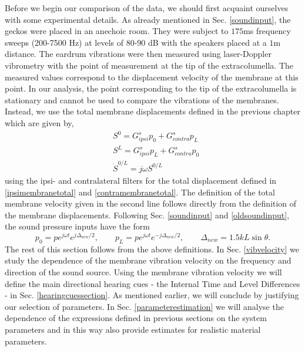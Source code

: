 Before we begin our comparison of the data, we should first acquaint ourselves with some experimental details. As already mentioned in Sec. \ref{soundinput}, the geckos were placed in
an anechoic room. They were subject to $175$ms frequency sweeps (200-7500 Hz) at levels of 80-90 dB with the speakers placed at
a $1$m distance. The eardrum vibrations were then measured using laser-Doppler vibrometry with the point
of measurement at the tip of the extracolumella. The measured values correspond to the displacement velocity of the membrane at this point.  
In our analysis, the point corresponding to the tip of the extracolumella is stationary and cannot be used to compare the vibrations of the membranes. 
Instead, we use the total membrane displacements defined in the previous chapter which are given by,
\begin{align}
 &S^0=G^s_{ipsi}p_0+G^s_{contra} p_L\\
 &S^L=G^s_{ipsi}p_L+G^s_{contra}p_0\\
 &\dot{S}^{0/L}=j\omega S^{0/L}\label{totalvelocity}
\end{align}
using the ipsi- and contralateral filters for the total displacement defined in \eqref{ipsimembranetotal} and \eqref{contramembranetotal}.
The definition of the total membrane velocity given in the second line follows directly from the definition of the membrane displacements. Following Sec. \ref{soundinput}
and \eqref{oldsoundinput}, the sound pressure inputs have the form
\begin{equation}\label{newsoundinput}
 p_0=pe^{j\omega t} e^{j\Delta_{new}/2},\qquad p_L=pe^{j\omega t} e^{-j\Delta_{new}/2},\qquad \Delta_{new}=1.5kL\sin\theta.
\end{equation}
The rest of this section follows from the above definitions. In Sec. \ref{vibvelocity} we study the dependence of the membrane vibration velocity 
on the frequency and direction of the sound source. Using the membrane vibration velocity we will define the main directional hearing cues
 - the Internal Time and Level Differences - in Sec. \ref{hearingcuessection}. As mentioned earlier, we will conclude by justifying our selection of parameters. In
Sec. \ref{parameterestimation} we will analyse the dependence of the expressions defined in previous sections on the system parameters 
and in this way also provide estimates for realistic material parameters. 

